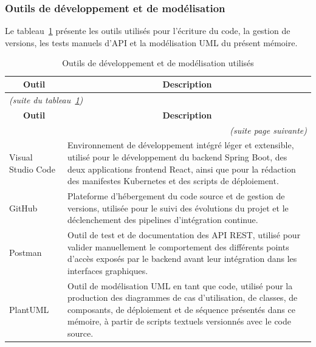 \vspace{1em}

\subsubsection{Outils de développement et de modélisation}

Le tableau~\ref{tab:outils-dev} présente les outils utilisés pour l'écriture du code, la gestion de versions, les tests manuels d'API et la modélisation UML du présent mémoire.

\begingroup
\centering
\renewcommand{\arraystretch}{1.2}
\begin{longtable}{|m{3cm}|m{11.5cm}|}
\caption{Outils de développement et de modélisation utilisés}
\label{tab:outils-dev}\\
\hline
\multicolumn{1}{|c|}{\textbf{Outil}} & \multicolumn{1}{c|}{\textbf{Description}} \\
\hline
\endfirsthead

\multicolumn{2}{l}{\small\itshape (suite du tableau~\ref{tab:outils-dev})}\\
\hline
\multicolumn{1}{|c|}{\textbf{Outil}} & \multicolumn{1}{c|}{\textbf{Description}} \\
\hline
\endhead

\hline
\multicolumn{2}{r}{\small\itshape (suite page suivante)}\\
\endfoot

\hline
\endlastfoot

Visual Studio Code & Environnement de développement intégré léger et extensible, utilisé pour le développement du backend Spring Boot, des deux applications frontend React, ainsi que pour la rédaction des manifestes Kubernetes et des scripts de déploiement. \\
\hline
GitHub & Plateforme d'hébergement du code source et de gestion de versions, utilisée pour le suivi des évolutions du projet et le déclenchement des pipelines d'intégration continue. \\
\hline
Postman & Outil de test et de documentation des API REST, utilisé pour valider manuellement le comportement des différents points d'accès exposés par le backend avant leur intégration dans les interfaces graphiques. \\
\hline
PlantUML~\cite{PlantUMLDoc} & Outil de modélisation UML en tant que code, utilisé pour la production des diagrammes de cas d'utilisation, de classes, de composants, de déploiement et de séquence présentés dans ce mémoire, à partir de scripts textuels versionnés avec le code source. \\
\hline
\end{longtable}
\endgroup


